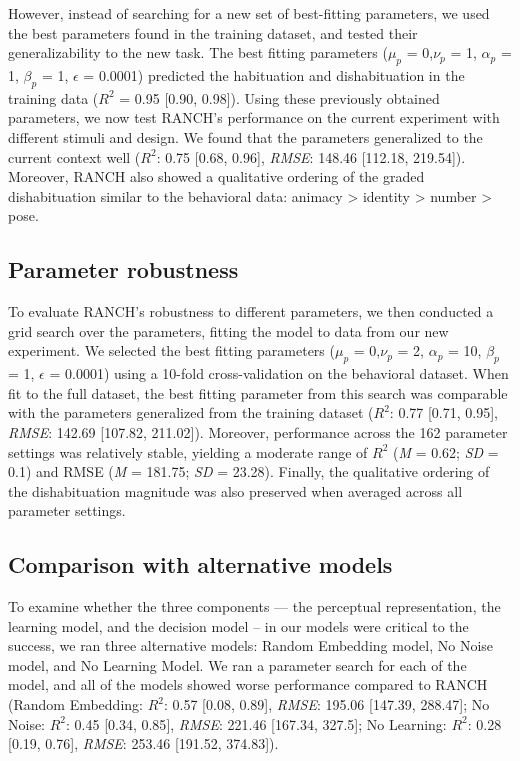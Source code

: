 \documentclass[10pt, letterpaper]{article}
\begin{document}
However, instead of searching for a new set of best-fitting parameters,
we used the best parameters found in the training dataset, and tested
their generalizability to the new task. The best fitting parameters
(\(\mu_{p}\) = 0,\(\nu_{p}\) = 1, \(\alpha_{p}\) = 1, \(\beta_{p}\) = 1,
\(\epsilon\) = 0.0001) predicted the habituation and dishabituation in
the training data (\(R^2\) = 0.95 {[}0.90, 0.98{]}). Using these
previously obtained parameters, we now test RANCH's performance on the
current experiment with different stimuli and design. We found that the
parameters generalized to the current context well (\(R^2\): 0.75
{[}0.68, 0.96{]}, \emph{RMSE}: 148.46 {[}112.18, 219.54{]}). Moreover,
RANCH also showed a qualitative ordering of the graded dishabituation
similar to the behavioral data: animacy \textgreater{} identity
\textgreater{} number \textgreater{} pose.

\hypertarget{parameter-robustness}{%
\subsection{Parameter robustness}\label{parameter-robustness}}

To evaluate RANCH's robustness to different parameters, we then
conducted a grid search over the parameters, fitting the model to data
from our new experiment. We selected the best fitting parameters
(\(\mu_{p}\) = 0,\(\nu_{p}\) = 2, \(\alpha_{p}\) = 10, \(\beta_{p}\) =
1, \(\epsilon\) = 0.0001) using a 10-fold cross-validation on the
behavioral dataset. When fit to the full dataset, the best fitting
parameter from this search was comparable with the parameters
generalized from the training dataset (\(R^2\): 0.77 {[}0.71, 0.95{]},
\emph{RMSE}: 142.69 {[}107.82, 211.02{]}). Moreover, performance across
the 162 parameter settings was relatively stable, yielding a moderate
range of \(R^2\) (\emph{M} = 0.62; \emph{SD} = 0.1) and RMSE (\emph{M} =
181.75; \emph{SD} = 23.28). Finally, the qualitative ordering of the
dishabituation magnitude was also preserved when averaged across all
parameter settings.

\hypertarget{comparison-with-alternative-models}{%
\subsection{Comparison with alternative
models}\label{comparison-with-alternative-models}}

To examine whether the three components --- the perceptual
representation, the learning model, and the decision model -- in our
models were critical to the success, we ran three alternative models:
Random Embedding model, No Noise model, and No Learning Model. We ran a
parameter search for each of the model, and all of the models showed
worse performance compared to RANCH (Random Embedding: \(R^2\): 0.57
{[}0.08, 0.89{]}, \emph{RMSE}: 195.06 {[}147.39, 288.47{]}; No Noise:
\(R^2\): 0.45 {[}0.34, 0.85{]}, \emph{RMSE}: 221.46 {[}167.34, 327.5{]};
No Learning: \(R^2\): 0.28 {[}0.19, 0.76{]}, \emph{RMSE}: 253.46
{[}191.52, 374.83{]}).
\end{document}
